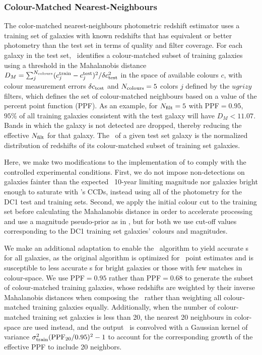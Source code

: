 \subsubsection{Colour-Matched Nearest-Neighbours}

The color-matched nearest-neighbours photometric redshift estimator \citep[\cmnn,][]{graham_photometric_2018} uses a training set of galaxies with known redshifts that has equivalent or better photometry than the test set in terms of quality and filter coverage.
For each galaxy in the test set, \cmnn\ identifies a colour-matched subset of training galaxies using a threshold in the Mahalanobis distance $D_M = \sum_{j}^{N_{\rm colours}} (c^{\rm train}_{j} - c^{\rm test}_{j})^{2} / \delta c_{\rm test}^2$ in the space of available colours $c$, with colour measurement errors $\delta c_{\rm test}$ and $N_{\rm colours} = 5$ colors $j$ defined by the $ugrizy$ filters, which defines the set of colour-matched neighbours based on a value of the percent point function (PPF).
As an example, for $N_{\rm{filt}}=5$ with PPF$=0.95$, $95\%$ of all training galaxies consistent with the test galaxy will have $D_M < 11.07$.
Bands in which the galaxy is not detected are dropped, thereby reducing the effective $N_{\rm{filt}}$ for that galaxy.
The \pzpdf\ of a given test set galaxy is the normalized distribution of redshifts of its colour-matched subset of training set galaxies.

Here, we make two modifications to the implementation of \citet{graham_photometric_2018} to comply with the controlled experimental conditions.
First, we do not impose non-detections on galaxies fainter than the expected \lsst\ 10-year limiting magnitude nor galaxies bright enough to saturate with \lsst's CCDs, instead using all of the photometry for the DC1 test and training sets.
Second, we apply the initial colour cut to the training set before calculating the Mahalanobis distance in order to accelerate processing and use a magnitude pseudo-prior as in \citet{graham_photometric_2018}, but for both we use cut-off values corresponding to the DC1 training set galaxies' colours and magnitudes.

We make an additional adaptation to enable the \cmnn\ algorithm to yield accurate \pzpdf s for all galaxies, as the original \citet{graham_photometric_2018} algorithm is optimized for \pz\ point estimates and is susceptible to less accurate \pzpdf s for bright galaxies or those with few matches in colour-space.
We use PPF$=0.95$ rather than PPF$=0.68$ to generate the subset of colour-matched training galaxies, whose redshifts are weighted by their inverse Mahalanobis distances when composing the \pzpdf\ rather than weighting all colour-matched training galaxies equally.
Additionally, when the number of colour-matched training set galaxies is less than 20, the nearest 20 neighbours in color-space are used instead, and the output \pzpdf\ is convolved with a Gaussian kernel of variance $\sigma_{\rm train}^{2}({\rm PPF}_{20}/0.95)^2 -1$ to account for the corresponding growth of the effective PPF to include 20 neighbors.

